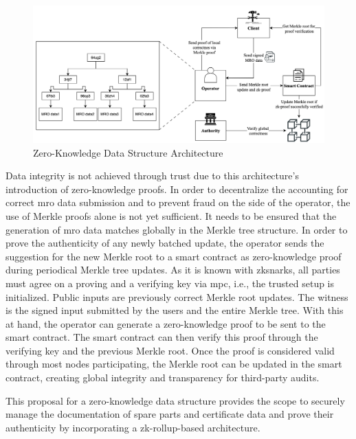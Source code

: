 \begin{figure}[hbt]
	\centering
		\includegraphics[width=1.0\textwidth]{Pictures/architecture.png}
	\caption{Zero-Knowledge Data Structure Architecture}
	\label{fig:arch}
\end{figure}
Data integrity is not achieved through trust due to this architecture's introduction of zero-knowledge proofs. In order to decentralize the accounting for correct \acrshort{mro} data submission and to prevent fraud on the side of the operator, the use of Merkle proofs alone is not yet sufficient. It needs to be ensured that the generation of \acrshort{mro} data matches globally in the Merkle tree structure. In order to prove the authenticity of any newly batched update, the operator sends the suggestion for the new Merkle root to a smart contract as zero-knowledge proof during periodical Merkle tree updates. As it is known with \acrshort{zksnark}s, all parties must agree on a proving and a verifying key via \acrshort{mpc}, i.e., the trusted setup is initialized. Public inputs are previously correct Merkle root updates. The witness is the signed input submitted by the users and the entire Merkle tree. With this at hand, the operator can generate a zero-knowledge proof to be sent to the smart contract. The smart contract can then verify this proof through the verifying key and the previous Merkle root. Once the proof is considered valid through most nodes participating, the Merkle root can be updated in the smart contract, creating global integrity and transparency for third-party audits. 

This proposal for a zero-knowledge data structure provides the scope to securely manage the documentation of spare parts and certificate data and prove their authenticity by incorporating a zk-rollup-based architecture.


